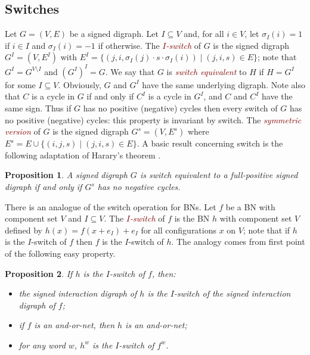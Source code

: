 \documentclass[11pt,letter]{article}
\newtheorem{proposition}{Proposition}
\newcommand{\EM}[1]{{\em\textcolor{Maroon}{#1}}}
\begin{document}
\subsection{Switches}

Let $G=(V,E)$ be a signed digraph. Let $I\subseteq V$ and, for all $i\in V$, let $\sigma_I(i)=1$ if $i\in I$ and $\sigma_I(i)=-1$ if otherwise. The \EM{$I$-switch} of $G$ is the signed digraph $G^I=(V,E^I)$ with $E^I=\{(j,i,\sigma_I(j)\cdot s\cdot\sigma_I(i))\mid (j,i,s)\in E\}$; note that $G^I=G^{V\setminus I}$ and $(G^I)^I=G$. We say that $G$ is \EM{switch equivalent} to $H$ if $H=G^I$ for some $I\subseteq V$. Obviously, $G$ and $G^I$ have the same underlying digraph. Note also that $C$ is a cycle in $G$ if and only if $C^I$ is a cycle in $G^I$, and $C$ and $C^I$ have the same sign. Thus if $G$ has no positive (negative) cycles then every switch of $G$ has no positive (negative) cycles: this property is invariant by switch. The \EM{symmetric version} of $G$ is the signed digraph $G^s=(V,E^s)$ where $E^s=E\cup \{(i,j,s)\mid (j,i,s)\in E\}$. A basic result concerning switch is the following adaptation of Harary's theorem \cite{H53}.

\begin{proposition}\label{pro:harary}
A signed digraph $G$ is switch equivalent to a full-positive signed digraph if and only if $G^s$ has no negative cycles.
\end{proposition}

There is an analogue of the switch operation for BNs. Let $f$ be a BN with component set $V$ and $I\subseteq V$. The \EM{$I$-switch} of $f$ is the BN $h$ with component set $V$ defined by $h(x)=f(x+e_I)+e_I$ for all configurations $x$ on $V$; note that if $h$ is the $I$-switch of $f$ then $f$ is the $I$-switch of $h$. The analogy comes from first point of the following easy property. 

\begin{proposition}\label{pro:BN_switch}
If $h$ is the $I$-switch of $f$, then:
\begin{itemize}
\item the signed interaction digraph of $h$ is the $I$-switch of the signed interaction digraph of $f$;
\item if $f$ is an and-or-net, then $h$ is an and-or-net;
\item for any word $w$, $h^w$ is the $I$-switch of $f^w$.
\end{itemize}
\end{proposition}
\end{document}
